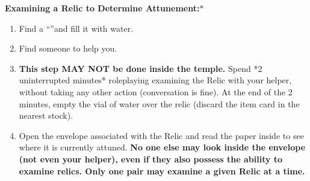 \documentclass[green]{GL2020}
\begin{document}
\textbf{Examining a Relic to Determine Attunement:}$*$
  \begin{enumerate}
    \item Find a ``\iGlassVial{}''and fill it with water.
		\item Find someone to help you.
    \item \textbf{This step MAY NOT be done inside the temple.} Spend *2 uninterrupted minutes* roleplaying examining the Relic with your helper, without taking any other action (conversation is fine). At the end of the 2 minutes, empty the vial of water over the relic (discard the item card in the nearest stock). 
    \item Open the envelope associated with the Relic and read the paper inside to see where it is currently attuned. \textbf{No one else may look inside the envelope (not even your helper), even if they also possess the ability to examine relics. Only one pair may examine a given Relic at a time.}
  \end{enumerate}
   
\end{document}

